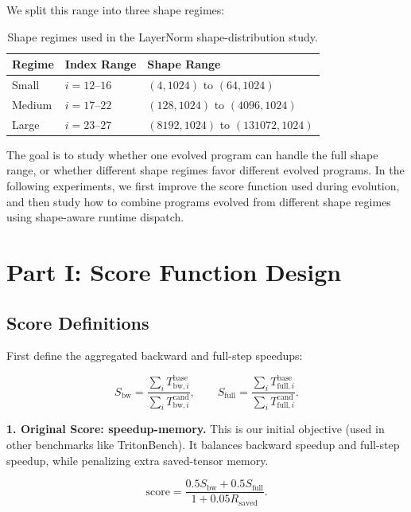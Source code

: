 \documentclass[11pt]{article}
\begin{document}
\noindent
We split this range into three shape regimes:

\begin{table}[h]
\centering
\small
\caption{Shape regimes used in the LayerNorm shape-distribution study.}
\begin{tabular}{lll}
\toprule
\textbf{Regime} & \textbf{Index Range} & \textbf{Shape Range} \\
\midrule
Small  & \(i=12\text{--}16\) & \((4,1024)\) to \((64,1024)\) \\
Medium & \(i=17\text{--}22\) & \((128,1024)\) to \((4096,1024)\) \\
Large  & \(i=23\text{--}27\) & \((8192,1024)\) to \((131072,1024)\) \\
\bottomrule
\end{tabular}
\end{table}

\noindent
The goal is to study whether one evolved program can handle the full shape range, or whether different shape regimes favor different evolved programs. In the following experiments, we first improve the score function used during evolution, and then study how to combine programs evolved from different shape regimes using shape-aware runtime dispatch.



\section{Part I: Score Function Design}

\subsection{Score Definitions}

\noindent
First define the aggregated backward and full-step speedups:

\[
S_{\mathrm{bw}}
=
\frac{
\sum_i T^{\mathrm{base}}_{\mathrm{bw}, i}
}{
\sum_i T^{\mathrm{cand}}_{\mathrm{bw}, i}
},
\qquad
S_{\mathrm{full}}
=
\frac{
\sum_i T^{\mathrm{base}}_{\mathrm{full}, i}
}{
\sum_i T^{\mathrm{cand}}_{\mathrm{full}, i}
}.
\]

\vspace{1em}

\noindent
\textbf{1. Original Score: speedup-memory.}
This is our initial objective (used in other benchmarks like TritonBench). It balances backward speedup and full-step speedup, while penalizing extra saved-tensor memory.

\[
\mathrm{score}
=
\frac{
0.5 S_{\mathrm{bw}} + 0.5 S_{\mathrm{full}}
}{
1 + 0.05 R_{\mathrm{saved}}
}.
\]
\end{document}
